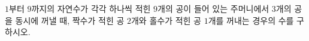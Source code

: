 \hspace*{2mm}\begin{minipage}[t]{\dimexpr\linewidth-2mm\relax}\vspace{0pt}
$1$부터 $9$까지의 자연수가 각각 하나씩 적힌 $9$개의 공이 들어 있는 주머니에서 $3$개의 공을 동시에 꺼낼 때, 짝수가 적힌 공 $2$개와 홀수가 적힌 공 $1$개를 꺼내는 경우의 수를 구하시오.\end{minipage}

